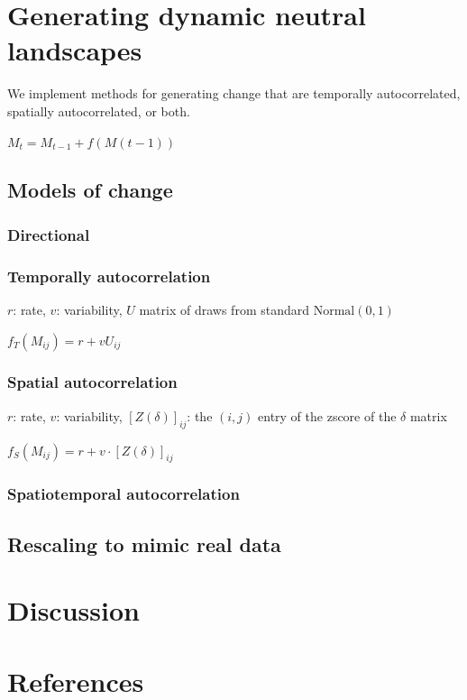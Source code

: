 \documentclass[11pt]{article}
\begin{document}
\hypertarget{generating-dynamic-neutral-landscapes}{%
\section{Generating dynamic neutral
landscapes}\label{generating-dynamic-neutral-landscapes}}

We implement methods for generating change that are temporally
autocorrelated, spatially autocorrelated, or both.

\(M_t = M_{t-1} + f(M(t-1))\)

\hypertarget{models-of-change}{%
\subsection{Models of change}\label{models-of-change}}

\hypertarget{directional}{%
\subsubsection{Directional}\label{directional}}

\hypertarget{temporally-autocorrelation}{%
\subsubsection{Temporally
autocorrelation}\label{temporally-autocorrelation}}

\(r\): rate, \(v\): variability, \(U\) matrix of draws from standard
\(\text{Normal}(0,1)\)

\(f_{T}(M_{ij}) = r + vU_{ij}\)

\hypertarget{spatial-autocorrelation}{%
\subsubsection{Spatial autocorrelation}\label{spatial-autocorrelation}}

\(r\): rate, \(v\): variability, \([Z(\delta)]_{ij}\): the \((i,j)\)
entry of the zscore of the \(\delta\) matrix

\(f_{S}(M_{ij}) = r + v \cdot [Z(\delta)]_{ij}\)

\hypertarget{spatiotemporal-autocorrelation}{%
\subsubsection{Spatiotemporal
autocorrelation}\label{spatiotemporal-autocorrelation}}

\hypertarget{rescaling-to-mimic-real-data}{%
\subsection{Rescaling to mimic real
data}\label{rescaling-to-mimic-real-data}}

\hypertarget{discussion}{%
\section{Discussion}\label{discussion}}

\hypertarget{references}{%
\section{References}\label{references}}
\end{document}
